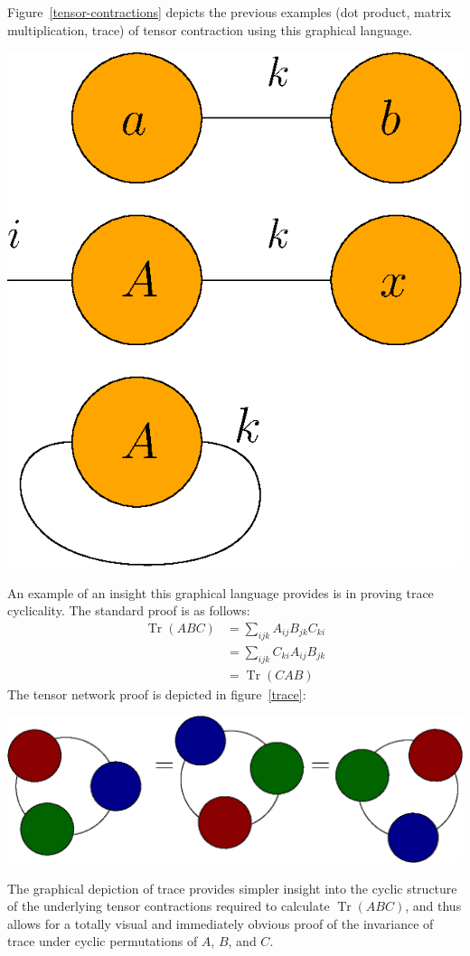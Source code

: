 \documentclass[12pt]{article}
\DeclareMathOperator{\Tr}{Tr}
\newenvironment{Figure}
  {\par\medskip\noindent\minipage{\linewidth}}
  {\endminipage\par\medskip}
\begin{document}
\begin{multicols}{2}
	Figure~\ref{tensor-contractions} depicts the previous examples (dot
	product, matrix multiplication, trace) of tensor contraction using
	this graphical language.
	\begin{Figure}
		\center\includegraphics[width=.5\textwidth]{./Figures/contractions.eps}
		\label{tensor-contractions}
	\end{Figure}
	An example of an insight this graphical language provides is in
	proving trace cyclicality. The standard proof is as follows:
	\begin{align*}
		\Tr(ABC)&=\sum_{ijk}A_{ij}B_{jk}C_{ki}\\
						&=\sum_{ijk}C_{ki}A_{ij}B_{jk}\\
						&=\Tr(CAB)
	\end{align*}
	The tensor network proof is depicted in figure~\ref{trace}:
	\begin{Figure}
		\center\includegraphics[width=.7\textwidth]{./Figures/trace.eps}
		\label{trace}
	\end{Figure}
	The graphical depiction of trace provides simpler insight into the
	cyclic structure of the underlying tensor contractions required to
	calculate $\Tr(ABC)$, and thus allows for a totally visual and
	immediately obvious proof of the invariance of trace under
	cyclic permutations of $A$, $B$, and $C$.




\end{multicols}
\end{document}
